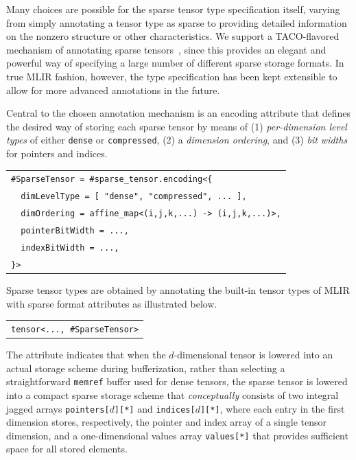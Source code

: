 \documentclass[10pt]{article}
\newcommand{\exam}{\begin{flushleft}\scriptsize\begin{tabular}{l}}
\newcommand{\maxe}{\end{tabular}\end{flushleft}}
\begin{document}
Many choices are possible for the sparse tensor type specification itself, varying from simply annotating a tensor type as sparse to providing detailed information on the nonzero structure or other characteristics. We support a TACO-flavored mechanism of annotating sparse tensors~\cite{drkjolstad}, since this provides an elegant and powerful way of specifying a large number of different sparse storage formats. In true MLIR fashion, however, the type specification has been kept extensible to allow for more advanced annotations in the future.

Central to the chosen annotation mechanism is an encoding attribute that defines the desired way of storing each sparse tensor by means of (1) \emph{per-dimension level types} of either \texttt{dense} or \texttt{compressed}, (2) a \emph{dimension ordering}, and (3) \emph{bit widths} for pointers and indices.
\exam
\verb"#SparseTensor = #sparse_tensor.encoding<{" \\
\verb+  dimLevelType = [ "dense", "compressed", ... ],+ \\
\verb"  dimOrdering = affine_map<(i,j,k,...) -> (i,j,k,...)>," \\
\verb"  pointerBitWidth = ...," \\
\verb"  indexBitWidth = ...," \\
\verb"}>"
\maxe

Sparse tensor types are obtained by annotating the built-in tensor types of MLIR with sparse format attributes as illustrated below.

\exam
\verb"tensor<..., #SparseTensor>"
\maxe

The attribute indicates that when the $d$-dimensional tensor is lowered into an actual storage scheme during bufferization, rather than selecting a straightforward \texttt{memref} buffer used for dense tensors, the sparse tensor is lowered into a compact sparse storage scheme that \emph{conceptually} consists of two integral jagged arrays \texttt{pointers[}$d$\texttt{][*]} and \texttt{indices[}$d$\texttt{][*]}, where each entry in the first dimension stores, respectively, the pointer and index array of a single tensor dimension, and a one-dimensional values array \texttt{values[*]} that provides sufficient space for all stored elements.
\end{document}
